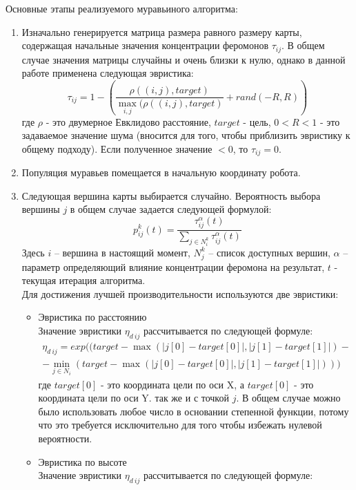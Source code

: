 \documentclass{article}
\numberwithin{equation}{section}
\begin{document}
			Основные этапы реализуемого муравьиного алгоритма:
			\begin{enumerate}
				\item Изначально генерируется матрица размера равного размеру карты, содержащая начальные значения концентрации феромонов $\tau_{ij}$. В общем случае значения матрицы случайны и очень близки к нулю, однако в данной работе применена следующая эвристика: \[
					\tau_{ij} = 1 - (\frac{\rho((i,j), target)}{\max_{i,j}(\rho((i,j), target)} + rand(- R, R))
				\]
				где $\rho$ - это двумерное Евклидово расстояние, $target$ - цель, $0 < R < 1$ - это задаваемое значение шума (вносится для того, чтобы приблизить эвристику к общему подходу). Если полученное значение $< 0$, то $\tau_{ij} = 0$.\\
				\item Популяция муравьев помещается в начальную координату робота.
				\item Следующая вершина карты выбирается случайно. Вероятность выбора вершины $j$ в общем случае задается следующей формулой:
				\[
					p_{ij}^{k}(t) = \frac{\tau_{ij}^{\alpha}(t)}{\sum\limits_{j \in N_{i}^{k}}\tau_{ij}^{\alpha}(t)}
				\]
				Здесь $i$ -- вершина в настоящий момент, $N_{j}^{k}$ -- список доступных вершин, $\alpha$ -- параметр определяющий влияние концентрации феромона на результат, $t$ - текущая итерация алгоритма. \\
				Для достижения лучшей производительности используются две эвристики: \\
				\begin{itemize}
					\item Эвристика по расстоянию\\
						Значение эвристики $\eta_{d\ ij}$ рассчитывается по следующей формуле:
						\begin{gather*}
							\eta_{d\ ij} = exp((target - \max(|j[0] - target[0]|, |j[1] - target[1]|) - \\
							 - \min_{j \in N_{i}}(target - \max(|j[0] - target[0]|, |j[1] - target[1]|)))
						\end{gather*}
						где $target[0]$ - это координата цели по оси X, а $target[0]$ - это координата цели по оси Y. так же и с точкой $j$. В общем случае можно было использовать любое число в основании степенной функции, потому что это требуется исключительно для того чтобы избежать нулевой вероятности.\\
					\item Эвристика по высоте\\
						Значение эвристики $\eta_{d\ ij}$ рассчитывается по следующей формуле:

\end{itemize}
\end{enumerate}
\end{document}
